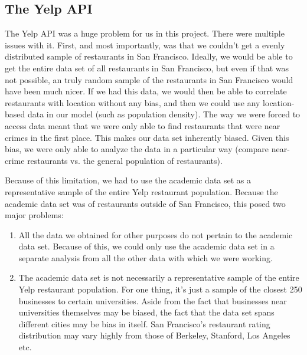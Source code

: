 \documentclass{article}
\begin{document}
\subsection{The Yelp API}

The Yelp API was a huge problem for us in this project. There were multiple
issues with it. First, and most importantly, was that we couldn't get a
evenly distributed sample of restaurants in San Francisco. Ideally, we
would be able to get the entire data set of all restaurants in San
Francisco, but even if that was not possible, an truly random sample of the
restaurants in San Francisco would have been much nicer. If we had this
data, we would then be able to correlate restaurants with location without
any bias, and then we could use any location-based data in our model (such
as population density). The way we were forced to access data meant that we
were only able to find restaurants that were near crimes in the first
place. This makes our data set inherently biased. Given this bias, we were
only able to analyze the data in a particular way (compare near-crime
restaurants vs. the general population of restaurants).

Because of this limitation, we had to use the academic data set as a
representative sample of the entire Yelp restaurant population. Because the
academic data set was of restaurants outside of San Francisco, this posed
two major problems:
\begin{enumerate}
\item All the data we obtained for other purposes do not pertain to the
  academic data set. Because of this, we could only use the academic data
  set in a separate analysis from all the other data with which we were
  working.
\item The academic data set is not necessarily a representative sample of
  the entire Yelp restaurant population. For one thing, it's just a sample
  of the closest 250 businesses to certain universities. Aside from the
  fact that businesses near universities themselves may be biased, the fact
  that the data set spans different cities may be bias in itself. San
  Francisco's restaurant rating distribution may vary highly from those of
  Berkeley, Stanford, Los Angeles etc.
\end{enumerate}
\end{document}

